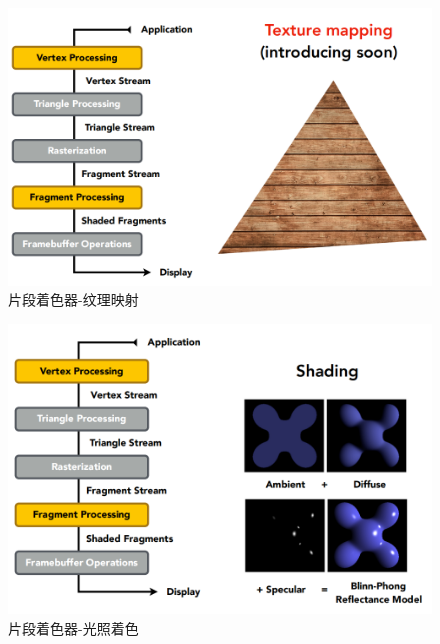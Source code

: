 \documentclass[UTF8,a4paper,12pt]{ctexbook}
\begin{document}
				\begin{figure}[H]
					\centering
					\includegraphics[scale=0.57]{Fragment-Texture}
					\caption{片段着色器-纹理映射}
				\end{figure}				
				
				\begin{figure}[H]
					\centering
					\includegraphics[scale=0.57]{Fragment-Light}
					\caption{片段着色器-光照着色}
				\end{figure}				
				
\end{document}
